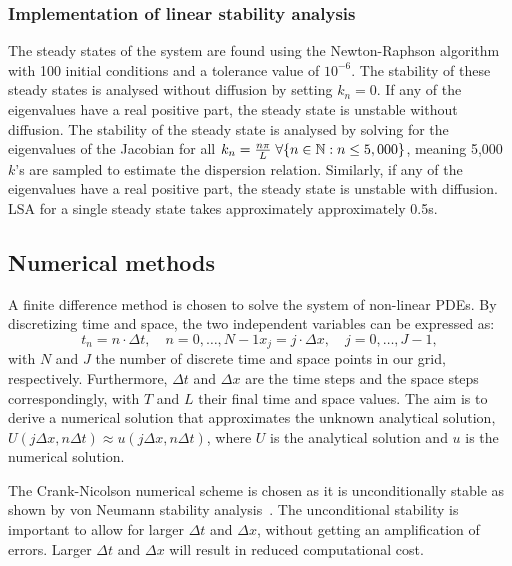 \subsubsection*{Implementation of linear stability analysis}
The steady states of the system are found using the Newton-Raphson algorithm with 100 initial conditions and a tolerance value of $10^{-6}$. The stability of these steady states is analysed without diffusion by setting $k_{n}=0$. If any of the eigenvalues have a real positive part, the steady state is unstable without diffusion. The stability of the steady state is analysed by solving for the eigenvalues of the Jacobian for all $k_{n}=\frac{n\pi}{L} \hspace{0.1cm}\forall \{n \in \mathbb{N} : n \leq 5,000\} $, meaning 5,000 $k$'s are sampled to estimate the dispersion relation. Similarly, if any of the eigenvalues have a real positive part, the steady state is unstable with diffusion. LSA for a single steady state takes approximately approximately 0.5s.

\subsection*{Numerical methods}\label{numerical methods}
A finite difference method is chosen to solve the system of non-linear PDEs. By discretizing time and space, the two independent variables can be expressed as:
\begin{subequations}
    \begin{equation}
        t_{n} = n \cdot \Delta t, \quad n=0,\dots,N-1
    \end{equation}
    \begin{equation}
        x_{j} = j \cdot \Delta x, \quad j=0, \dots,J-1,
    \end{equation}
\end{subequations}
with $N$ and $J$  the number of discrete time and space points in our grid, respectively. Furthermore, $\Delta t$ and $\Delta x$ are the time steps and the space steps correspondingly, with $T$ and $L$  their final time and space values. The aim is to derive a numerical solution that approximates the unknown analytical solution, $U(j\Delta x, n\Delta t)\approx u( j\Delta x, n\Delta t)$, where $U$ is the analytical solution and $u$ is the numerical solution.

The Crank-Nicolson numerical scheme is chosen as it is unconditionally stable as shown by von Neumann stability analysis~\parencite{strikwerda2004finite}.
The unconditional stability is important to allow for larger $\Delta t$ and $\Delta x$, without getting an amplification of errors. Larger $\Delta t$ and $\Delta x$ will result in reduced computational cost.


